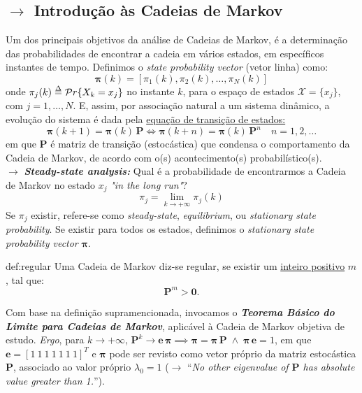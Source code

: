 \subsection[4.1 Introdução às Cadeias de Markov e Teorema Básico do Limite]{$\rightarrow$ Introdução às Cadeias de Markov}
\label{subsec:intro}

Um dos principais objetivos da análise de Cadeias de Markov, é a determinação das probabilidades de encontrar a cadeia em vários estados, em específicos instantes de tempo. Definimos o \textit{state probability vector} (vetor linha) como:
$$
    \pmb{\pi}(k) = [\pi_1(k), \pi_2(k), \dots, \pi_N(k)]
$$
onde $\pi_j(k) \delequal \mathcal{P}r\{X_k=x_j\}$ no instante $k$, para o espaço de estados $\mathcal{X} = \{x_j\}$, com $j = 1,\dots,N$. E, assim, por associação natural a um sistema dinâmico, a evolução do sistema é dada pela \underline{equação de transição de estados:}
$$
    \pmb{\pi}(k+1) = \pmb{\pi}(k)\, \pmb{P} \iff \pmb{\pi}(k+n) = \pmb{\pi}(k)\, \pmb{P}^n\quad n=1,2,\dots
$$
em que $\pmb{P}$ é matriz de transição (estocástica) que condensa o comportamento da Cadeia de Markov, de acordo com o(s) acontecimento(s) probabilístico(s).
\\[6pt]
\noindent $\rightarrow$ \textbf{\textit{Steady-state analysis:}} Qual é a probabilidade de encontrarmos a Cadeia de Markov no estado $x_j$ \textit{"in the long run"\footnotemark[2]}? 
$$ \pi_j = \lim_{k\to+\infty} \pi_j(k) $$
Se $\pi_j$ existir, refere-se como \textit{steady-state}, \textit{equilibrium}, ou \textit{stationary
state probability}. Se existir para todos os estados, definimos o \textit{stationary state probability vector} $\pmb{\pi}$.

\begin{theo}{def:regular}
    Uma Cadeia de Markov diz-se regular, se existir um \underline{inteiro positivo} $m$, tal que: 
    \vspace{-0.75em}
    $$ \pmb{P}^m > \pmb{0}. $$
    \vspace{-2em}
    \vphantom{1}
\end{theo}

\noindent Com base na definição supramencionada, invocamos o \textit{\textbf{Teorema Básico do Limite para Cadeias de Markov}}\cite{Luenberger1979}, aplicável à Cadeia de Markov objetiva de estudo. \textit{Ergo}, para $k\to+\infty$, $\pmb{P}^k \to \pmb{e}\, \pmb{\pi} \implies \pmb{\pi} = \pmb{\pi}\, \pmb{P} \;\land\; \pmb{\pi}\, \pmb{e} = 1$, em que $\pmb{e} = [1\: 1\: 1\: 1\: 1\: 1\: 1]^T$ e $\pmb{\pi}$ pode ser revisto como vetor próprio da matriz estocástica $\pmb{P}$, associado ao valor próprio $\lambda_0 = 1$ ($\rightarrow$ ``\textit{No other eigenvalue of $\pmb{P}$ has absolute value greater than 1.}''\cite{Luenberger1979}).

